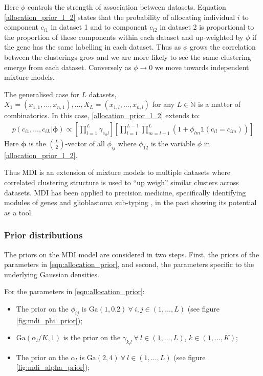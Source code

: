 \documentclass[12pt]{article} %
\begin{document}
	Here $\phi$ controls the strength of association between datasets. Equation \eqref{allocation_prior_l_2} states that the probability of allocating individual $i$ to component $c_{i1}$ in dataset 1 and to component $c_{i2}$ in dataset 2 is proportional to the proportion of these components within each dataset and up-weighted by $\phi$ if the gene has the same labelling in each dataset. Thus as $\phi$ grows the correlation between the clusterings grow and we are more likely to see the same clustering emerge from each dataset. Conversely as $\phi \to 0$ we move towards independent mixture models. 
	
	The generalised case for $L$ datasets, $X_1 = (x_{1,1},\ldots,x_{n,1}),\ldots, X_L = (x_{1,l},\ldots,x_{n,l})$ for any $L \in \mathbb{N}$ is a matter of combinatorics. In this case, \eqref{allocation_prior_l_2} extends to:
	\begin{align} \label{eqn:allocation_prior}
	p(c_{i1},\ldots,c_{iL} | \boldsymbol{\phi}) \propto \left[\prod_{l=1}^L\gamma_{c_{il}l} \right]\left[\prod_{l=1}^{L-1}\prod_{m=l+1}^L\left(1+\phi_{lm}\mathbb{1}(c_{il} = c_{im}) \right)\right]
	\end{align}
	Here $\boldsymbol{\phi}$ is the ${L \choose 2}$-vector of all $\phi_{ij}$ where $\phi_{12}$ is the variable $\phi$ in \eqref{allocation_prior_l_2}.

	Thus MDI is an extension of mixture models to multiple datasets where correlated clustering structure is used to ``up weigh'' similar clusters across datasets. MDI has been applied to precision medicine, specifically identifying modules of genes and glioblastoma sub-typing \citep{SavageIdentifyingcancersubtypes2013a}, in the past showing its potential as a tool.
	
	\subsubsection{Prior distributions}
	The priors on the MDI model are considered in two steps. First, the priors of the parameters in \eqref{eqn:allocation_prior}, and second, the parameters specific to the underlying Gaussian densities.
	
	For the parameters in \eqref{eqn:allocation_prior}:
	\begin{itemize}
		\item The prior on the $\phi_{ij}$ is $\text{Ga}(1, 0.2) \: \forall \: i,j \in (1, \ldots, L)$ (see figure \ref{fig:mdi_phi_prior}); 
		\item $\text{Ga}(\alpha_l / K, 1)$ is the prior on the $\gamma_{k_ll}  \: \forall \: l \in (1, \ldots, L)$, $k \in (1,\ldots, K)$;
		\item The prior on the $\alpha_l$ is $\text{Ga}(2,4) \: \forall \: l \in (1,\ldots,L)$ (see figure \ref{fig:mdi_alpha_prior});
	\end{itemize}
\end{document}
